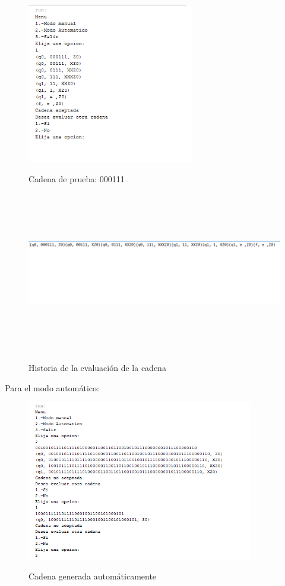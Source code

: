 \begin{figure}[H]
\includegraphics[width=\textwidth, height=7cm]{ModoManualPila2.png}
\label{fig:manual_pila2}
\caption{Cadena de prueba: 000111}
\end{figure}

\begin{figure}[H]
\includegraphics[width=\textwidth, height=7cm]{ArchivoPila.png}
\label{fig:manualtexto_alfabeto}
\caption{Historia de la evaluaci\'on de la cadena}
\end{figure}

Para el modo autom\'atico:\\
\begin{figure}[H]
\includegraphics[width=\textwidth, height=7cm]{ModoAutomaticoPila.png}
\label{fig:auto_alfabeto}
\caption{Cadena generada autom\'aticamente}
\end{figure}


